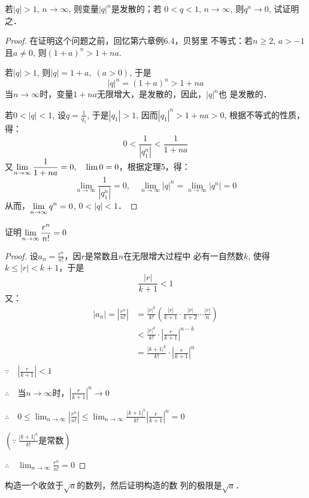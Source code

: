 \begin{example}
    若$|q|>1$, $n\to\infty$, 则变量$|q|^n$是发散的；若
$0<q<1$, $n\to\infty$, 则$q^n\to 0$, 试证明之．
\end{example}



\begin{proof}
在证明这个问题之前，回忆第六章例6.4，贝努里
不等式：若$n\ge 2$, $a>-1$且$a\ne 0$, 则$(1+a)^n>1+na$.

若$|q|>1$, 则$|q|=1+a,\; (a>0)$, 于是
\[|q|^n=(1+a)^n>1+na\]
当$n\to\infty$时，变量$1+na$无限增大，是发散的，因此，$|q|^n$也
是发散的．

若$0<|q|<1$, 设$q=\frac{1}{q_1}$,
于是$|q_1|>1$, 因而$|q_1|^n>1+na>0$, 根据不等式的性质，
得：
\[0<\frac{1}{|q^n_1|}<\frac{1}{1+na}\]
又$\displaystyle\lim_{n\to\infty}\dfrac{1}{1+na}=0,\quad \lim 0=0$，根据定理5，得：
\[\lim_{n\to\infty}\frac{1}{|q^n_1|}=0,\quad \lim_{n\to\infty}|q|^n=\lim_{n\to\infty}|q^n|=0\]
从而，$\displaystyle\lim_{n\to\infty}q^n=0$, $0<|q|<1$．
\end{proof}

\begin{example}
    证明$\displaystyle\lim_{n\to\infty}\dfrac{r^n}{n!}=0$
\end{example}

\begin{proof}
设$a_n=\frac{r^n}{n!}$，因$r$是常数且$n$在无限增大过程中
必有一自然数$k$, 使得$k\le |r|<k+1$，于是
\[\frac{|r|}{k+1}<1\]
又：
\[\begin{split}
|a_n|=\left|\frac{r^n}{n!}\right|&=\frac{|r|^k}{k!}\left(\frac{|r|}{k+1}\cdot \frac{|r|}{k+2}\cdots \frac{|r|}{n}\right)\\
&<\frac{|r|^k}{k!}\cdot \left|\frac{r}{k+1}\right|^{n-k}\\
&=\frac{|k+1|^k}{k!}\cdot \left|\frac{r}{k+1}\right|^{n}\\
\end{split}\]
$\because\quad  \left|\frac{r}{k+1}\right|<1$

$\therefore\quad $当$n\to\infty$时，$ \left|\frac{r}{k+1}\right|^n\to 0$
    
$\therefore\quad 0\le \lim_{n\to\infty}\left|\frac{r^n}{n!}\right|\le \lim_{n\to\infty}\frac{|k+1|^k}{k!} \left|\frac{r}{k+1}\right|^{n}=0$

\qquad $\left(\because\ \frac{|k+1|^k}{k!}\text{是常数}\right)$

$\therefore\quad \lim_{n\to\infty}\frac{r^n}{n!}=0$
\end{proof}

\begin{example}
    构造一个收敛于$\sqrt{a}$的数列，然后证明构造的数
列的极限是$\sqrt{a}$．
\end{example}


